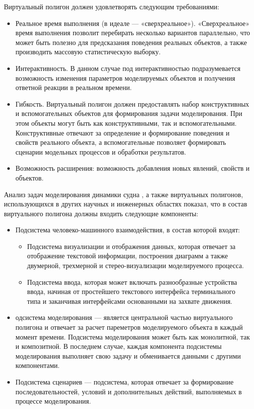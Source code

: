 Виртуальный полигон должен удовлетворять следующим требованиями:
\begin{itemize}
	\item 	Реальное время выполнения (в идеале --- «сверхреальное»). «Сверхреальное» 
			время выполнения позволит перебирать несколько вариантов параллельно, что может быть полезно для предсказания поведения реальных объектов, а также производить массовую статистическую выборку.
	\item 	Интерактивность. В данном случае под интерактивностью подразумевается 
			возможность изменения параметров моделируемых объектов и получения 
			ответной реакции в реальном времени.
	\item 	Гибкость. Виртуальный полигон должен предоставлять набор конструктивных 
			и вспомогательных объектов для формирования задачи моделирования.  
			При этом объекты могут быть как конструктивными, так и вспомогательными. 
			Конструктивные отвечают за определение и формирование поведения и свойств 
			реального объекта, а вспомогательные позволяет формировать сценарии 
			модельных процессов и обработки результатов.
	\item 	Возможность расширения: возможность добавления новых явлений, свойств и объектов.
\end{itemize}

Анализ задач моделирования динамики судна \citep{nechaev_ai}, а также виртуальных полигонов, использующихся в других научных и инженерных областях показал, что в состав виртуального полигона должны входить следующие компоненты:
\begin{itemize}
	\item   Подсистема человеко-машинного взаимодействия, в состав которой входят:
		\begin{itemize}
		\item 	Подсистема визуализации и отображения данных, 
				которая отвечает за отображение текстовой информации, 
				построения диаграмм а также двумерной, трехмерной и 
				стерео-визуализации моделируемого процесса.
		\item 	Подсистема ввода, которая может включать разнообразные 
				устройства ввода, начиная от простейшего текстового 
				интерфейса терминального типа и заканчивая интерфейсами 
				основанными на захвате движения.
		\end{itemize}
	\item	одсистема моделирования --- является центральной 
			частью виртуального полигона и отвечает за расчет пареметров 
			моделируемого объекта в каждый момент времени. Подсистема 
			моделирования может быть как монолитной, так и композитной. 
			В последнем случае, каждая компонента подсистемы моделирования 
			выполняет свою задачу и обменивается данными с другими компонентами.
	\item	Подсистема сценариев --- подсистема, которая отвечает за 
			формирование последовательностей, условий и дополнительных 
			действий, выполняемых в процессе моделирования.
\end{itemize}

